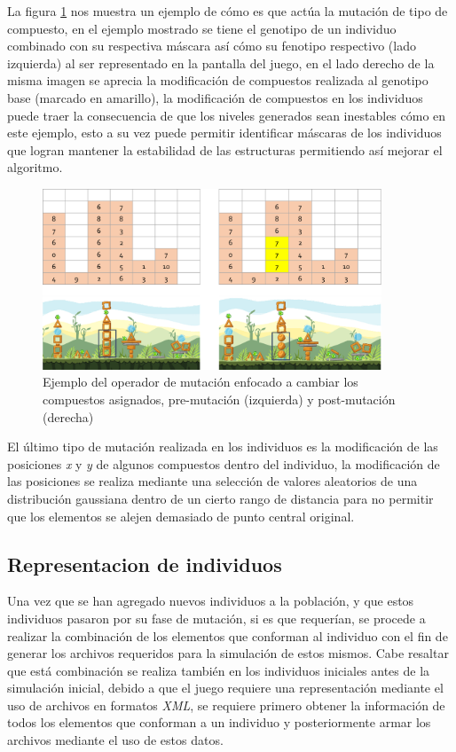 La figura \ref{figure:mutate_composite} nos muestra un ejemplo de cómo es que
actúa la mutación de tipo de compuesto, en el ejemplo mostrado se tiene el
genotipo de un individuo combinado con su respectiva máscara así cómo su
fenotipo respectivo (lado izquierda) al ser representado en la pantalla del
juego, en el lado derecho de la misma imagen se aprecia la modificación de
compuestos realizada al genotipo base (marcado en amarillo), la modificación de
compuestos en los individuos puede traer la consecuencia de que los niveles
generados sean inestables cómo en este ejemplo, esto a su vez puede permitir
identificar máscaras de los individuos que logran mantener la estabilidad de las
estructuras permitiendo así mejorar el algoritmo.

\begin{figure}
  \centering
  \includegraphics[width=0.9\textwidth]{img/mutation_composite.png}
  \caption{Ejemplo del operador de mutación enfocado a cambiar los compuestos asignados, pre-mutación (izquierda) y post-mutación (derecha)}
  \label{figure:mutate_composite}
\end{figure}

El último tipo de mutación realizada en los individuos es la modificación de las
posiciones \textit{x} y \textit{y} de algunos compuestos dentro del individuo,
la modificación de las posiciones se realiza mediante una selección de valores
aleatorios de una distribución gaussiana dentro de un cierto rango de distancia
para no permitir que los elementos se alejen demasiado de punto central
original.

\subsection{Representacion de individuos}
\label{section:individual_representation}

Una vez que se han agregado nuevos individuos a la población, y que estos
individuos pasaron por su fase de mutación, si es que requerían, se procede a
realizar la combinación de los elementos que conforman al individuo con el fin
de generar los archivos requeridos para la simulación de estos mismos. Cabe
resaltar que está combinación se realiza también en los individuos iniciales
antes de la simulación inicial, debido a que el juego requiere una
representación mediante el uso de archivos en formatos \textit{XML}, se requiere
primero obtener la información de todos los elementos que conforman a un
individuo y posteriormente armar los archivos mediante el uso de estos datos.

